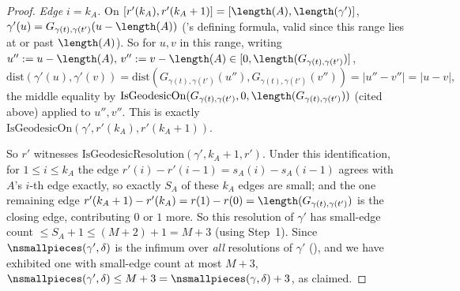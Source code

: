 \begin{proof}
  \emph{Edge $i=k_A$.} On $[r'(k_A),r'(k_A+1)] = [\length(A),\length(\gamma')]$, $\gamma'(u) =
  G_{\gamma(t),\gamma(t')}(u-\length(A))$ ('s defining formula, valid since
  this range lies at or past $\length(A)$). So for $u,v$ in this range, writing
  $u'':=u-\length(A),\,v'':=v-\length(A) \in [0,\length(G_{\gamma(t),\gamma(t')})]$,
  \[
    \mathrm{dist}(\gamma'(u),\gamma'(v)) =
    \mathrm{dist}(G_{\gamma(t),\gamma(t')}(u''),G_{\gamma(t),\gamma(t')}(v'')) = |u''-v''| = |u-v|
    ,
  \]
  the middle equality by $\mathrm{IsGeodesicOn}(G_{\gamma(t),\gamma(t')},0,
  \length(G_{\gamma(t),\gamma(t')}))$ (cited above) applied to $u'',v''$. This is exactly
  $\mathrm{IsGeodesicOn}(\gamma',r'(k_A),r'(k_A+1))$.

  So $r'$ witnesses $\mathrm{IsGeodesicResolution}(\gamma',k_A+1,r')$. Under this identification,
  for $1\le i\le k_A$ the edge $r'(i)-r'(i-1)=s_A(i)-s_A(i-1)$ agrees with $A$'s $i$-th edge
  exactly, so exactly $S_A$ of these $k_A$ edges are small; and the one remaining edge
  $r'(k_A+1)-r'(k_A) = r(1)-r(0) = \length(G_{\gamma(t),\gamma(t')})$ is the closing edge,
  contributing $0$ or $1$ more. So this resolution of $\gamma'$ has small-edge count $\le S_A+1 \le
  (M+2)+1 = M+3$ (using Step~1). Since $\nsmallpieces(\gamma',\delta)$ is the infimum over
  \emph{all} resolutions of $\gamma'$ (), and we have exhibited one with
  small-edge count at most $M+3$, $\nsmallpieces(\gamma',\delta) \le M+3 =
  \nsmallpieces(\gamma,\delta)+3$, as claimed.
\end{proof}
